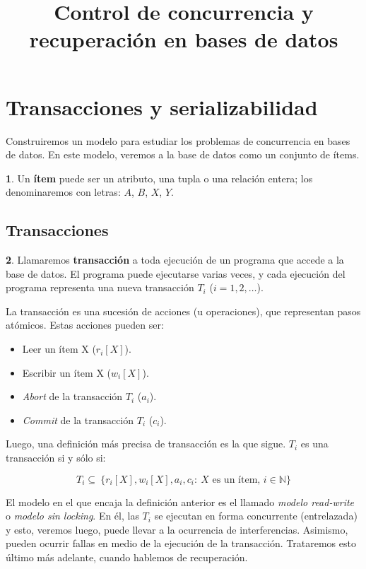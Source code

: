 \documentclass[english]{article}
\theoremstyle{definition}
\theoremstyle{definition}
\newtheorem*{defn*}{\protect\definitionname}
\providecommand{\definitionname}{Definición}
\begin{document}
\title{Control de concurrencia y recuperación en bases de datos}


\section{Transacciones y serializabilidad}

Construiremos un modelo para estudiar los problemas de concurrencia en bases
de datos. En este modelo, veremos a la base de datos como un conjunto de
ítems.

\begin{defn*}
Un \textbf{ítem} puede ser un atributo, una tupla o una relación entera; los
denominaremos con letras: $A$, $B$, $X$, $Y$.
\end{defn*}

\subsection{Transacciones}

\begin{defn*}
Llamaremos \textbf{transacción} a toda ejecución de un programa que accede a
la base de datos. El programa puede ejecutarse varias veces, y cada ejecución
del programa representa una nueva transacción $T_i$ ($i = 1, 2, \dots$).

La transacción es una sucesión de acciones (u operaciones), que representan
pasos atómicos. Estas acciones pueden ser:

\begin{itemize}
    \item Leer un ítem X ($r_i[X]$).
    \item Escribir un ítem X ($w_i[X]$).
    \item \emph{Abort} de la transacción $T_i$ ($a_i$).
    \item \emph{Commit} de la transacción $T_i$ ($c_i$).
\end{itemize}

Luego, una definición más precisa de transacción es la que sigue. $T_i$ es una
transacción si y sólo si:

$$T_i \subseteq \
    \{r_i[X], w_i[X], a_i, c_i: \
        X \mbox{ es un ítem, } i \in \mathbb{N}\}$$
\end{defn*}

El modelo en el que encaja la definición anterior es el llamado \emph{modelo
read-write} o \emph{modelo sin locking}. En él, las $T_i$ se ejecutan en forma
concurrente (entrelazada) y esto, veremos luego, puede llevar a la ocurrencia
de interferencias. Asimismo, pueden ocurrir fallas en medio de la ejecución de
la transacción. Trataremos esto último más adelante, cuando hablemos de
recuperación.
\end{document}
